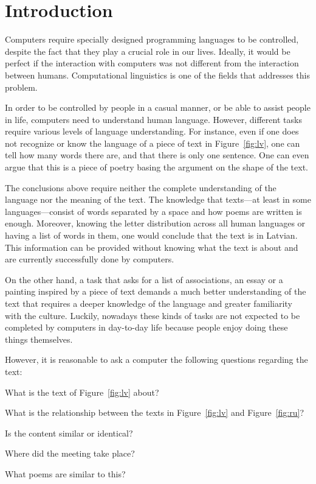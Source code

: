 \chapter{Introduction}
\label{ch:introduction}

Computers require specially designed programming languages to be controlled, despite the fact that they play a crucial role in our lives. Ideally, it would be perfect if the interaction with computers was not different from the interaction between humans. Computational linguistics is one of the fields that addresses this problem.

In order to be controlled by people in a casual manner, or be able to assist people in life, computers need to understand human language. However, different tasks require various levels of language understanding. For instance, even if one does not recognize or know the language of a piece of text in Figure~\ref{fig:lv}, one can tell how many words there are, and that there is only one sentence. One can even argue that this is a piece of poetry basing the argument on the shape of the text.

The conclusions above require neither the complete understanding of the language nor the meaning of the text. The knowledge that texts---at least in some languages---consist of words separated by a space and how poems are written is enough. Moreover, knowing the letter distribution across all human languages or having a list of words in them, one would conclude that the text is in Latvian. This information can be provided without knowing what the text is about and are currently successfully done by computers.



On the other hand, a task that asks for a list of associations, an essay or a painting inspired by a piece of text demands a much better understanding of the text that requires a deeper knowledge of the language and greater familiarity with the culture. Luckily, nowadays these kinds of tasks are not expected to be completed by computers in day-to-day life because people enjoy doing these things themselves.

However, it is reasonable to ask a computer the following questions regarding the text:
\begin{inparaenum}[a)]
\item What is the text of Figure~\ref{fig:lv} about?
\item What is the relationship between the texts in Figure~\ref{fig:lv} and
  Figure~\ref{fig:ru}?
\item Is the content similar or identical?
\item Where did the meeting take place?
\item What poems are similar to this?
\end{inparaenum}

